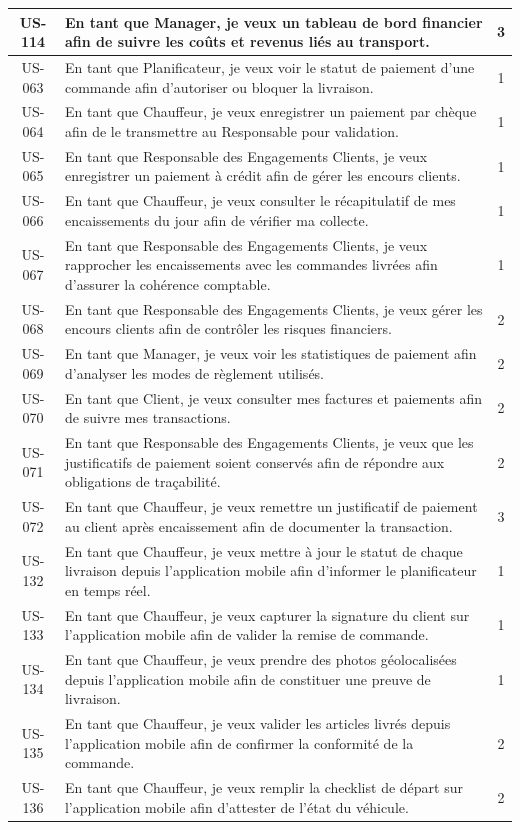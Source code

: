 \begin{longtable}{|c|>{\raggedright\arraybackslash}p{13cm}|c|}
US-114 & En tant que Manager, je veux un tableau de bord financier afin de suivre les coûts et revenus liés au transport. & 3 \\\hline
US-063 & En tant que Planificateur, je veux voir le statut de paiement d'une commande afin d'autoriser ou bloquer la livraison. & 1 \\\hline
US-064 & En tant que Chauffeur, je veux enregistrer un paiement par chèque afin de le transmettre au Responsable pour validation. & 1 \\\hline
US-065 & En tant que Responsable des Engagements Clients, je veux enregistrer un paiement à crédit afin de gérer les encours clients. & 1 \\\hline
US-066 & En tant que Chauffeur, je veux consulter le récapitulatif de mes encaissements du jour afin de vérifier ma collecte. & 1 \\\hline
US-067 & En tant que Responsable des Engagements Clients, je veux rapprocher les encaissements avec les commandes livrées afin d'assurer la cohérence comptable. & 1 \\\hline
US-068 & En tant que Responsable des Engagements Clients, je veux gérer les encours clients afin de contrôler les risques financiers. & 2 \\\hline
US-069 & En tant que Manager, je veux voir les statistiques de paiement afin d'analyser les modes de règlement utilisés. & 2 \\\hline
US-070 & En tant que Client, je veux consulter mes factures et paiements afin de suivre mes transactions. & 2 \\\hline
US-071 & En tant que Responsable des Engagements Clients, je veux que les justificatifs de paiement soient conservés afin de répondre aux obligations de traçabilité. & 2 \\\hline
US-072 & En tant que Chauffeur, je veux remettre un justificatif de paiement au client après encaissement afin de documenter la transaction. & 3 \\\hline
US-132 & En tant que Chauffeur, je veux mettre à jour le statut de chaque livraison depuis l'application mobile afin d'informer le planificateur en temps réel. & 1 \\\hline
US-133 & En tant que Chauffeur, je veux capturer la signature du client sur l'application mobile afin de valider la remise de commande. & 1 \\\hline
US-134 & En tant que Chauffeur, je veux prendre des photos géolocalisées depuis l'application mobile afin de constituer une preuve de livraison. & 1 \\\hline
US-135 & En tant que Chauffeur, je veux valider les articles livrés depuis l'application mobile afin de confirmer la conformité de la commande. & 2 \\\hline
US-136 & En tant que Chauffeur, je veux remplir la checklist de départ sur l'application mobile afin d'attester de l'état du véhicule. & 2 \\\hline


\end{longtable}
